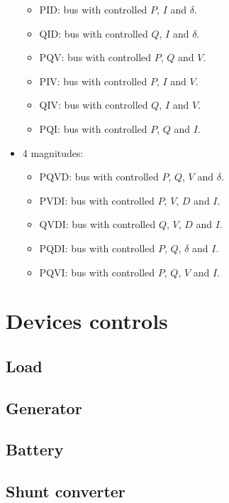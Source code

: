 \documentclass[11pt]{article}
\begin{document}
\begin{itemize}
\begin{itemize}
			\item PID: bus with controlled $P$, $I$ and $\delta$.
			\item QID: bus with controlled $Q$, $I$ and $\delta$.
			\item PQV: bus with controlled $P$, $Q$ and $V$.
			\item PIV: bus with controlled $P$, $I$ and $V$.
			\item QIV: bus with controlled $Q$, $I$ and $V$.
			\item PQI: bus with controlled $P$, $Q$ and $I$.
		\end{itemize}
		\item 4 magnitudes:
		\begin{itemize}
			\item PQVD: bus with controlled $P$, $Q$, $V$ and $\delta$.
			\item PVDI: bus with controlled $P$, $V$, $D$ and $I$.
			\item QVDI: bus with controlled $Q$, $V$, $D$ and $I$.
			\item PQDI: bus with controlled $P$, $Q$, $\delta$ and $I$.
			\item PQVI: bus with controlled $P$, $Q$, $V$ and $I$.
		\end{itemize}
	\end{itemize}



	\section{Devices controls}

	\subsection{Load}


	\subsection{Generator}


	\subsection{Battery}

	
	\subsection{Shunt converter}
\end{document}
